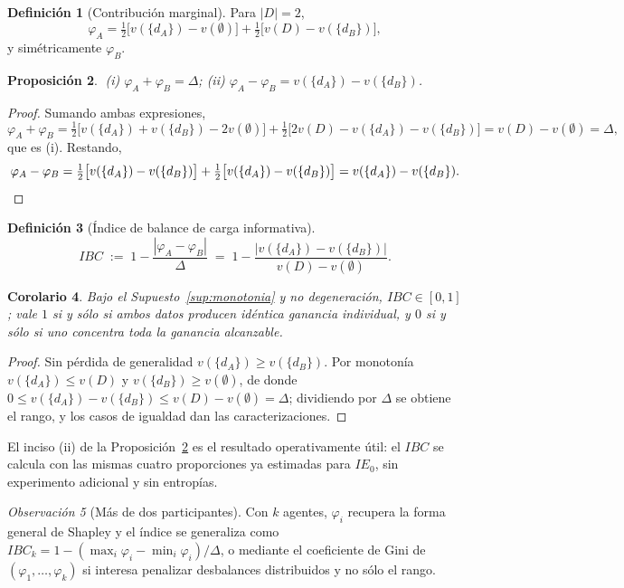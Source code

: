 \documentclass[11pt,a4paper]{article}
\theoremstyle{definition}
\newtheorem{definicion}{Definición}[section]
\theoremstyle{plain}
\newtheorem{proposicion}[definicion]{Proposición}
\newtheorem{corolario}[definicion]{Corolario}
\theoremstyle{remark}
\newtheorem{observacion}[definicion]{Observación}
\begin{document}
\begin{definicion}[Contribución marginal]
Para $|D|=2$,
\[
  \varphi_A=\tfrac12\big[v(\{d_A\})-v(\emptyset)\big]+\tfrac12\big[v(D)-v(\{d_B\})\big],
\]
y simétricamente $\varphi_B$.
\end{definicion}

\begin{proposicion}\label{prop:ibc}
$\;$(i) $\varphi_A+\varphi_B=\Delta$; \quad
(ii) $\varphi_A-\varphi_B=v(\{d_A\})-v(\{d_B\})$.
\end{proposicion}

\begin{proof}
Sumando ambas expresiones,
\[
  \varphi_A+\varphi_B
  =\tfrac12\big[v(\{d_A\})+v(\{d_B\})-2v(\emptyset)\big]
  +\tfrac12\big[2v(D)-v(\{d_A\})-v(\{d_B\})\big]
  =v(D)-v(\emptyset)=\Delta,
\]
que es (i). Restando,
\[
  \varphi_A-\varphi_B
  =\tfrac12\big[v(\{d_A\})-v(\{d_B\})\big]+\tfrac12\big[v(\{d_A\})-v(\{d_B\})\big]
  =v(\{d_A\})-v(\{d_B\}).\qedhere
\]
\end{proof}

\begin{definicion}[Índice de balance de carga informativa]
\[
  IBC\;:=\;1-\frac{|\varphi_A-\varphi_B|}{\Delta}
        \;=\;1-\frac{\big|v(\{d_A\})-v(\{d_B\})\big|}{v(D)-v(\emptyset)}.
\]
\end{definicion}

\begin{corolario}
Bajo el Supuesto~\ref{sup:monotonia} y no degeneración, $IBC\in[0,1]$; vale $1$ si
y sólo si ambos datos producen idéntica ganancia individual, y $0$ si y sólo si
uno concentra toda la ganancia alcanzable.
\end{corolario}

\begin{proof}
Sin pérdida de generalidad $v(\{d_A\})\ge v(\{d_B\})$. Por monotonía
$v(\{d_A\})\le v(D)$ y $v(\{d_B\})\ge v(\emptyset)$, de donde
$0\le v(\{d_A\})-v(\{d_B\})\le v(D)-v(\emptyset)=\Delta$; dividiendo por $\Delta$
se obtiene el rango, y los casos de igualdad dan las caracterizaciones.
\end{proof}

El inciso (ii) de la Proposición~\ref{prop:ibc} es el resultado operativamente
útil: el $IBC$ se calcula con las mismas cuatro proporciones ya estimadas para
$IE_0$, sin experimento adicional y sin entropías.

\begin{observacion}[Más de dos participantes]
Con $k$ agentes, $\varphi_i$ recupera la forma general de Shapley y el índice se
generaliza como $IBC_k=1-(\max_i\varphi_i-\min_i\varphi_i)/\Delta$, o mediante el
coeficiente de Gini de $(\varphi_1,\dots,\varphi_k)$ si interesa penalizar
desbalances distribuidos y no sólo el rango.
\end{observacion}
\end{document}
